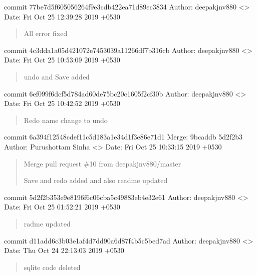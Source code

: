 \documentclass[letterpaper,10pt,english]{sphinxmanual}
\begin{document}
commit 77be7d5f605056264f9e3cdb422ea71d89ec3834
Author: deepakjnv880 \textless{}\textgreater{}
Date:   Fri Oct 25 12:39:28 2019 +0530
\begin{quote}

All error fixed
\end{quote}

commit 4c3dda1a05d421072e7453039a11266df7b316cb
Author: deepakjnv880 \textless{}\textgreater{}
Date:   Fri Oct 25 10:53:09 2019 +0530
\begin{quote}

undo and Save added
\end{quote}

commit 6ef099f6dcf5d784ad60de75bc20c1605f2cf30b
Author: deepakjnv880 \textless{}\textgreater{}
Date:   Fri Oct 25 10:42:52 2019 +0530
\begin{quote}

Redo name change to undo
\end{quote}

commit 6a394f12548cdef11c5d183a1e34d1f3e86e71d1
Merge: 9bcaddb 5d2f2b3
Author: Purushottam Sinha \textless{}\textgreater{}
Date:   Fri Oct 25 10:33:15 2019 +0530
\begin{quote}

Merge pull request \#10 from deepakjnv880/master

Save and redo added and also readme updated
\end{quote}

commit 5d2f2b353e9e8196f6c06cba5c49883eb4e32e61
Author: deepakjnv880 \textless{}\textgreater{}
Date:   Fri Oct 25 01:52:21 2019 +0530
\begin{quote}

radme updated
\end{quote}

commit d11add6c3b03e1af4d7dd90a6d87f4b5c5bed7ad
Author: deepakjnv880 \textless{}\textgreater{}
Date:   Thu Oct 24 22:13:03 2019 +0530
\begin{quote}

sqlite code deleted
\end{quote}
\end{document}
